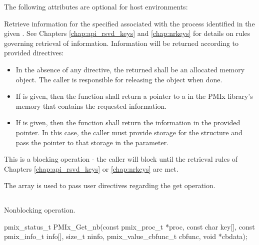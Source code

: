 \reqattrend

\optattrstart
The following attributes are optional for host environments:


\optattrend

\descr

Retrieve information for the specified  associated with the process identified in the given . See Chapters \ref{chap:api_rsvd_keys} and \ref{chap:nrkeys} for details on rules governing retrieval of information. Information will be returned according to provided directives:

\begin{itemize}
    \item In the absence of any directive, the returned  shall be an allocated memory object. The caller is responsible for releasing the object when done.
    \item If  is given, then the function shall return a pointer to a  in the \ac{PMIx} library's memory that contains the requested information.
    \item If  is given, then the function shall return the information in the provided  pointer. In this case, the caller must provide storage for the structure and pass the pointer to that storage in the  parameter.
\end{itemize}

This is a blocking operation - the caller will block until the retrieval rules of Chapters \ref{chap:api_rsvd_keys} or \ref{chap:nrkeys} are met.

The  array is used to pass user directives regarding the get operation.

\subsection{}

\summary

Nonblocking  operation.

\format

\cspecificstart
\begin{codepar}
pmix_status_t
PMIx_Get_nb(const pmix_proc_t *proc, const char key[],
            const pmix_info_t info[], size_t ninfo,
            pmix_value_cbfunc_t cbfunc, void *cbdata);
\end{codepar}
\cspecificend

